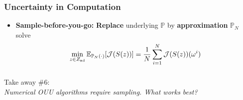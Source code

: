 \documentclass[aspectratio=169,xcolor=dvipsnames,10pt]{beamer}
\newcommand{\risk}{\mathcal{R}}
\begin{document}
\begin{frame}\frametitle{Uncertainty in Computation}
\begin{exampleblock}{}
\begin{itemize}
\item \textbf{Sample-before-you-go:} \textbf{Replace} underlying $\mathbb P$ by  \textbf{approximation} $\mathbb P_N$ solve
\[
\min_{z \in Z_{\rm ad}} \mathbb E_{\mathbb P_N(\cdot)}[\mathcal{J}(S(z))] = \frac{1}{N}\sum_{i=1}^{N} \mathcal{J}(S(z))(\omega^i)
\]
\end{itemize}
\end{exampleblock}
\end{frame}

\begin{frame}\frametitle{}
\begin{center}\Large
Take away \#6:\\
\textit{Numerical OUU algorithms require sampling. What works best?}
\end{center}
\end{frame}
\end{document}
